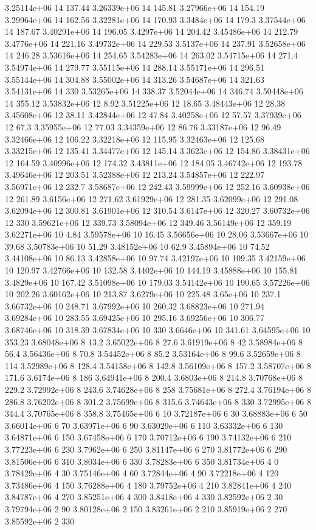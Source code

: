 3.25114e+06 14 137.44
3.26339e+06 14 145.81
3.27966e+06 14 154.19
3.29964e+06 14 162.56
3.32281e+06 14 170.93
3.3484e+06 14 179.3
3.37544e+06 14 187.67
3.40291e+06 14 196.05
3.4297e+06 14 204.42
3.45486e+06 14 212.79
3.4776e+06 14 221.16
3.49732e+06 14 229.53
3.5137e+06 14 237.91
3.52658e+06 14 246.28
3.53616e+06 14 254.65
3.54283e+06 14 263.02
3.54715e+06 14 271.4
3.54974e+06 14 279.77
3.55115e+06 14 288.14
3.55171e+06 14 296.51
3.55144e+06 14 304.88
3.55002e+06 14 313.26
3.54687e+06 14 321.63
3.54131e+06 14 330
3.53265e+06 14 338.37
3.52044e+06 14 346.74
3.50448e+06 14 355.12
3.53832e+06 12 8.92
3.51225e+06 12 18.65
3.48443e+06 12 28.38
3.45608e+06 12 38.11
3.42844e+06 12 47.84
3.40258e+06 12 57.57
3.37939e+06 12 67.3
3.35955e+06 12 77.03
3.34359e+06 12 86.76
3.33187e+06 12 96.49
3.32466e+06 12 106.22
3.32218e+06 12 115.95
3.32463e+06 12 125.68
3.33215e+06 12 135.41
3.34477e+06 12 145.14
3.3623e+06 12 154.86
3.38431e+06 12 164.59
3.40996e+06 12 174.32
3.43811e+06 12 184.05
3.46742e+06 12 193.78
3.49646e+06 12 203.51
3.52388e+06 12 213.24
3.54857e+06 12 222.97
3.56971e+06 12 232.7
3.58687e+06 12 242.43
3.59999e+06 12 252.16
3.60938e+06 12 261.89
3.6156e+06 12 271.62
3.61929e+06 12 281.35
3.62099e+06 12 291.08
3.62094e+06 12 300.81
3.61901e+06 12 310.54
3.6147e+06 12 320.27
3.60732e+06 12 330
3.59621e+06 12 339.73
3.58094e+06 12 349.46
3.56149e+06 12 359.19
3.62271e+06 10 4.84
3.59578e+06 10 16.45
3.56656e+06 10 28.06
3.53667e+06 10 39.68
3.50783e+06 10 51.29
3.48152e+06 10 62.9
3.45894e+06 10 74.52
3.44108e+06 10 86.13
3.42858e+06 10 97.74
3.42197e+06 10 109.35
3.42159e+06 10 120.97
3.42766e+06 10 132.58
3.4402e+06 10 144.19
3.45888e+06 10 155.81
3.4829e+06 10 167.42
3.51098e+06 10 179.03
3.54142e+06 10 190.65
3.57226e+06 10 202.26
3.60162e+06 10 213.87
3.6279e+06 10 225.48
3.65e+06 10 237.1
3.66732e+06 10 248.71
3.67992e+06 10 260.32
3.68823e+06 10 271.94
3.69284e+06 10 283.55
3.69425e+06 10 295.16
3.69256e+06 10 306.77
3.68746e+06 10 318.39
3.67834e+06 10 330
3.6646e+06 10 341.61
3.64595e+06 10 353.23
3.68048e+06 8 13.2
3.65022e+06 8 27.6
3.61919e+06 8 42
3.58984e+06 8 56.4
3.56436e+06 8 70.8
3.54452e+06 8 85.2
3.53164e+06 8 99.6
3.52659e+06 8 114
3.52989e+06 8 128.4
3.54158e+06 8 142.8
3.56109e+06 8 157.2
3.58707e+06 8 171.6
3.6174e+06 8 186
3.64941e+06 8 200.4
3.6803e+06 8 214.8
3.70768e+06 8 229.2
3.72992e+06 8 243.6
3.74628e+06 8 258
3.75681e+06 8 272.4
3.76194e+06 8 286.8
3.76202e+06 8 301.2
3.75699e+06 8 315.6
3.74643e+06 8 330
3.72995e+06 8 344.4
3.70765e+06 8 358.8
3.75465e+06 6 10
3.72187e+06 6 30
3.68883e+06 6 50
3.66014e+06 6 70
3.63971e+06 6 90
3.63029e+06 6 110
3.63332e+06 6 130
3.64871e+06 6 150
3.67458e+06 6 170
3.70712e+06 6 190
3.74132e+06 6 210
3.77223e+06 6 230
3.7962e+06 6 250
3.81147e+06 6 270
3.81772e+06 6 290
3.81506e+06 6 310
3.8034e+06 6 330
3.78283e+06 6 350
3.81734e+06 4 0
3.78429e+06 4 30
3.75146e+06 4 60
3.72844e+06 4 90
3.72218e+06 4 120
3.73486e+06 4 150
3.76288e+06 4 180
3.79752e+06 4 210
3.82841e+06 4 240
3.84787e+06 4 270
3.85251e+06 4 300
3.8418e+06 4 330
3.82592e+06 2 30
3.79794e+06 2 90
3.80128e+06 2 150
3.83261e+06 2 210
3.85919e+06 2 270
3.85592e+06 2 330
